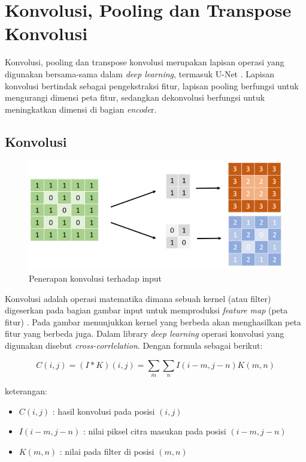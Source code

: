 \section{Konvolusi, Pooling dan Transpose Konvolusi}

\noindent Konvolusi, pooling dan transpose konvolusi merupakan lapisan operasi yang digunakan bersama-sama dalam \textit{deep learning}, termasuk U-Net \cite{goodfellow_deep_2016,pajankar_convolutional_2022,bishop_deep_2024}.  Lapisan konvolusi bertindak sebagai pengekstraksi fitur, lapisan pooling berfungsi untuk mengurangi dimensi peta fitur, sedangkan dekonvolusi berfungsi untuk meningkatkan dimensi di bagian \textit{encode}r. 

\subsection{Konvolusi}

\begin{figure}[H]
	\centering
	\includegraphics[scale=.3]{gambar/convolusi.png}
	\caption{Penerapan konvolusi terhadap input \cite{huang_fully_2022}}
	\label{fig:convolusi}
\end{figure}

\noindent Konvolusi adalah operasi matematika dimana sebuah kernel (atau filter) digeserkan pada bagian gambar input untuk memproduksi \textit{feature map} (peta fitur) \cite{pajankar_convolutional_2022}.  Pada gambar menunjukkan kernel yang berbeda akan menghasilkan peta fitur yang berbeda juga. Dalam library \textit{deep learning} operasi  konvolusi yang digunakan disebut \textit{cross-corrlelation}\cite{goodfellow_deep_2016}. Dengan formula sebagai berikut:

\begin{equation}
	C(i, j) = (I * K)(i, j) = \sum_{m} \sum_{n} I(i - m, j - n) K(m, n)
\end{equation}


\noindent
keterangan:
\begin{itemize}
	\item $C(i,j)$ : hasil konvolusi pada posisi $(i,j)$
	\item $I(i-m, j-n)$ : nilai piksel citra masukan pada posisi $(i-m, j-n)$
	\item $K(m,n)$ : nilai pada filter di posisi $(m,n)$
\end{itemize}

